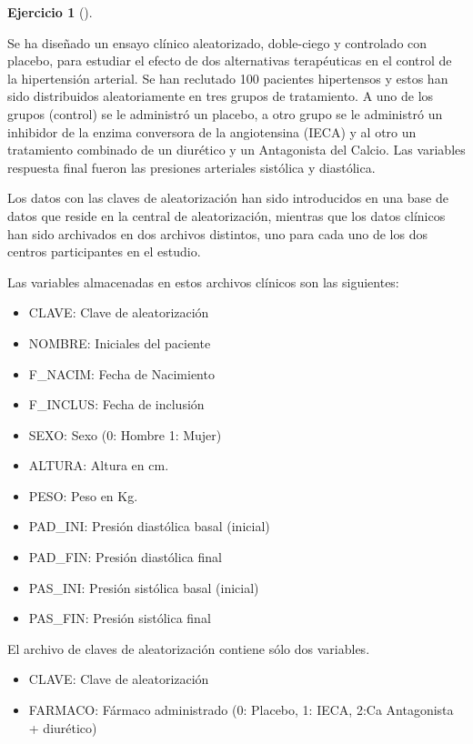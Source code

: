 \documentclass[
  a4paper,
]{scrreport}
\providecommand{\tightlist}{%
  \setlength{\itemsep}{0pt}\setlength{\parskip}{0pt}}\usepackage{longtable,booktabs,array}
\theoremstyle{definition}
\newtheorem{exercise}{Ejercicio}[chapter]
\theoremstyle{remark}
\begin{document}
\begin{exercise}[]\protect\hypertarget{exr-preprocesamiento-5}{}\label{exr-preprocesamiento-5}

Se ha diseñado un ensayo clínico aleatorizado, doble-ciego y controlado
con placebo, para estudiar el efecto de dos alternativas terapéuticas en
el control de la hipertensión arterial. Se han reclutado 100 pacientes
hipertensos y estos han sido distribuidos aleatoriamente en tres grupos
de tratamiento. A uno de los grupos (control) se le administró un
placebo, a otro grupo se le administró un inhibidor de la enzima
conversora de la angiotensina (IECA) y al otro un tratamiento combinado
de un diurético y un Antagonista del Calcio. Las variables respuesta
final fueron las presiones arteriales sistólica y diastólica.

Los datos con las claves de aleatorización han sido introducidos en una
base de datos que reside en la central de aleatorización, mientras que
los datos clínicos han sido archivados en dos archivos distintos, uno
para cada uno de los dos centros participantes en el estudio.

Las variables almacenadas en estos archivos clínicos son las siguientes:

\begin{itemize}
\tightlist
\item
  CLAVE: Clave de aleatorización
\item
  NOMBRE: Iniciales del paciente
\item
  F\_NACIM: Fecha de Nacimiento
\item
  F\_INCLUS: Fecha de inclusión
\item
  SEXO: Sexo (0: Hombre 1: Mujer)
\item
  ALTURA: Altura en cm.
\item
  PESO: Peso en Kg.
\item
  PAD\_INI: Presión diastólica basal (inicial)
\item
  PAD\_FIN: Presión diastólica final
\item
  PAS\_INI: Presión sistólica basal (inicial)
\item
  PAS\_FIN: Presión sistólica final
\end{itemize}

El archivo de claves de aleatorización contiene sólo dos variables.

\begin{itemize}
\tightlist
\item
  CLAVE: Clave de aleatorización
\item
  FARMACO: Fármaco administrado (0: Placebo, 1: IECA, 2:Ca Antagonista +
  diurético)
\end{itemize}


\end{exercise}
\end{document}
